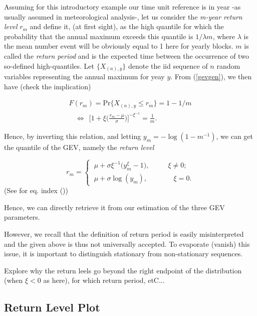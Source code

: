\documentclass[11pt,a4paper,openany ]{book}
\begin{document}
Assuming for this introductory example our time unit reference is in year -as usually assumed in meteorological analysis-, let us consider the \emph{m-year return level} $r_m$ and define it, (at first sight), as the high quantile for which the probability that the annual maximum exceeds this quantile is $1/\lambda m$, where $\lambda$ is the mean number event  will be obviously equal to 1 here for yearly blocks.  $m$ is called the \emph{return period} and is the expected time between the occurrence of two so-defined high-quantiles. Let $\{X_{(n),y}\}$ denote the iid sequence of $n$ random variables representing the annual maximum for yeay $y$. From (\ref{gevgen}), we then have (check the implication)


\begin{align*}
F(r_m)=\text{Pr}\{X_{(n),y}\leq r_m\}=1-1/m 
\\ \ \ \ \ \Leftrightarrow \ \ \Bigg[1+\xi\bigg(\frac{r_m-\mu}{\sigma}\bigg)\Bigg]^{-\xi^{-1}}=\frac{1}{m}.
\end{align*}

Hence, by inverting this relation, and letting $y_m=-\log(1-m^{-1})$, we can get the quantile of the GEV, namely the \emph{return level}

\begin{equation}\label{rleqgev}
r_m=\begin{cases}
\ \mu+\sigma\xi^{-1}\big(y_m^{\xi}-1\big), \ \ \ \ \ \ \ \  \ \ \ \ \xi\neq 0;\\
\ \mu +\sigma \log(y_m), \ \ \ \ \ \ \ \ \  \ \ \ \ \ \ \ \ \xi =0.
\end{cases}
\end{equation}
(See for eq. index ())

Hence, we can directly retrieve it from our estimation of the three GEV parameters.

However, we recall that the definition of return period is easily misinterpreted and the given above is thus not universally accepted. %
To evaporate (vanish) this issue, it is important to distinguish stationary from non-stationary sequences.\newline

Explore why the return leels go beyond the right endpoint of the distribution (when $\xi<0$ as here), for which return period, etC...

\subsection{Return Level Plot}\label{rlplot}
\end{document}
